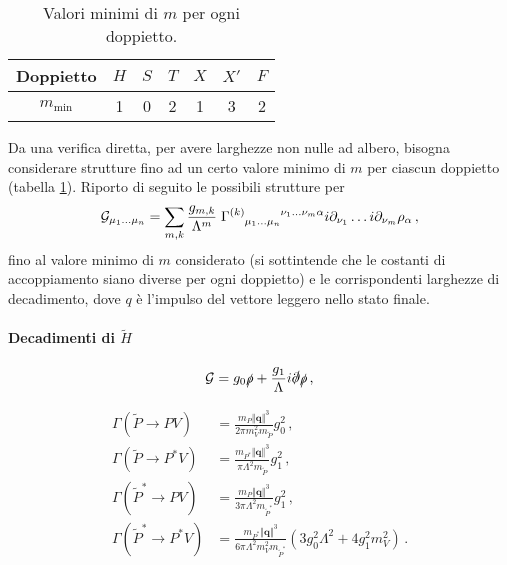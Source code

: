 \documentclass{article}
\begin{document}
\begin{table}
  \centering
  \begin{tabular}{ccccccc}
    \toprule
    Doppietto      & $H$ & $S$ & $T$ & $X$ & $X'$ & $F$ \\
    \midrule
    $m_\text{min}$ &  1  &  0  &  2  &  1  &  3   &  2  \\
    \bottomrule
  \end{tabular}
  \caption{Valori minimi di $m$ per ogni doppietto.}
  \label{tab:m}
\end{table}

Da una verifica diretta, per avere larghezze non nulle ad albero, bisogna considerare strutture fino ad un certo valore minimo di $m$ per ciascun doppietto (tabella \ref{tab:m}). Riporto di seguito le possibili strutture per
\begin{equation}
  \mathcal{G}_{\mu_1 \dots \mu_n} =  \sum_{m,k} \frac{g_{m,k}}{\Lambda^m} \; \Gamma\indices{^{(k)}_{\mu_1 \dots \mu_n}^{\nu_1 \dots \nu_m \alpha}} i \partial_{\nu_1} \dots i \partial_{\nu_m} \rho_\alpha \, ,
\end{equation}
fino al valore minimo di $m$ considerato (si sottintende che le costanti di accoppiamento siano diverse per ogni doppietto) e le corrispondenti larghezze di decadimento, dove $q$ è l'impulso del vettore leggero nello stato finale.

\paragraph{Decadimenti di $\tilde{H}$}
\begin{equation}
  \mathcal{G} = g_0 \slashed{\rho} + \frac{g_1}{\Lambda} i \slashed{\partial}\slashed{\rho} \, ,
\end{equation}

\begin{align}
  \Gamma\left( \tilde{P} \to P V \right) &= \frac{m_P \Vert \mathbf{q} \Vert^3}{2 \pi m_V^2 m_{\tilde{P}}} g_0^2 \, , \\
  \Gamma\left( \tilde{P} \to P^* V \right) &= \frac{m_{P^*} \Vert \mathbf{q} \Vert^3}{\pi  \Lambda ^2 m_{\tilde{P}}} g_1^2 \, , \\
  \Gamma\left( \tilde{P}^* \to P V \right) &= \frac{m_P \Vert \mathbf{q} \Vert^3}{3 \pi  \Lambda ^2 m_{\tilde{P}^*}} g_1^2 \, , \\
  \Gamma\left( \tilde{P}^* \to P^* V \right) &= \frac{m_{P^*} \Vert \mathbf{q} \Vert^3}{6 \pi  \Lambda ^2 m_V^2 m_{\tilde{P}^*}} \left(3 g_0^2 \Lambda ^2+4 g_1^2 m_V^2\right) \, .
\end{align}
\end{document}
